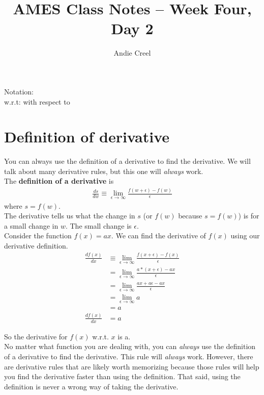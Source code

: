 \documentclass{article}
\title{AMES Class Notes -- Week Four, Day 2}
\author{Andie Creel}
\begin{document}
\maketitle
Notation: \\
w.r.t: with respect to


\section{Definition of derivative}
You can always use the definition of a derivative to find the derivative. We will talk about many derivative rules, but this one will \textit{always} work.\\

The \textbf{definition of a derivative} is 
\begin{align}
    \frac{ds}{dw} \equiv \lim_{\epsilon \to \infty} \frac{f(w+\epsilon) - f(w)}{\epsilon}
\end{align}
where $s = f(w)$. \\

The derivative tells us what the change in $s$ (or $f(w)$ because $s = f(w)$) is for a small change in $w$. The small change is $\epsilon$. \\

Consider the function $f(x) = ax$. We can find the derivative of $f(x)$ using our derivative definition. \\

\begin{align}
    \frac{df(x)}{dx} &\equiv \lim_{\epsilon \to \infty} \frac{f(x+ \epsilon) - f(x)}{\epsilon}\\
    &= \lim_{\epsilon \to \infty} \frac{a*(x + \epsilon) - ax}{\epsilon}\\
    &= \lim_{\epsilon \to \infty} \frac{ax + a\epsilon - ax}{\epsilon}\\
    &= \lim_{\epsilon \to \infty} a\\
    &= a \\
    \frac{df(x)}{dx} &= a
\end{align}

So the derivative for $f(x)$ w.r.t. $x$ is a. \\

No matter what function you are dealing with, you can \textit{always} use the definition of a derivative to find the derivative. This rule will \textit{always} work. However, there are derivative rules that are likely worth memorizing because those rules will help you find the derivative faster than using the definition. That said, using the definition is never a wrong way of taking the derivative.  \\
\end{document}
